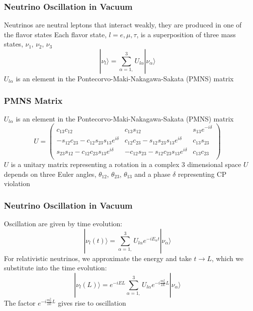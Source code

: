 \documentclass[10pt,professionalfonts,xcolor=table]{beamer}
\begin{document}
\frame
{
  \frametitle{Neutrino Oscillation in Vacuum}
  \begin{itemize}
  \bang Neutrinos are neutral leptons that interact weakly, they are produced in one of the flavor states
  \gap
  \bang Each flavor state, $l=e,\mu,\tau$,  is a superposition of three mass states, $\nu_1$, $\nu_2$, $\nu_3$
  \gap
  \begin{equation*}
|\nu_l \rangle = \sum_{\alpha = 1,}^3 U_{l\alpha}|\nu_\alpha \rangle
  \end{equation*}
  \gap
  \bang $U_{l\alpha}$ is an element in the Pontecorvo-Maki-Nakagawa-Sakata (PMNS) matrix
  \end{itemize}

}


\frame
{
  \frametitle{PMNS Matrix}
  \begin{itemize}
  \bang $U_{l\alpha}$ is an element in the Pontecorvo-Maki-Nakagawa-Sakata (PMNS) matrix
  \begin{equation*}
 U = \begin{pmatrix} \label{pmns}
c_{13}c_{12}              &    c_{13}s_{12} 	   	 & 		s_{13} e^{-i\delta} \\
-s_{12}c_{23} - c_{12}s_{23}s_{13}e^{i\delta}	& c_{12}c_{23} - s_{12}s_{23}s_{13}e^{i\delta} 				& 		c_{13}s_{23}  \\
s_{23}s_{12} - c_{12}c_{23}s_{13}e^{i\delta}	& -c_{12}s_{23} - s_{12}c_{23}s_{13}e^{i\delta} 				& 		c_{13}c_{23}  \\
\end{pmatrix}
\end{equation*}
\gap
\bang $U$ is a unitary matrix representing a rotation in a complex 3 dimensional space
\gap
\bang $U$ depends on three Euler angles, $\theta_{12}$, $\theta_{23}$, $\theta_{13}$ and a phase $\delta$ representing CP violation
  \end{itemize}
}

\frame
{
  \frametitle{Neutrino Oscillation in Vacuum}
  \begin{itemize}
	\bang Oscillation are given by time evolution:
	\begin{equation*}
		|\nu_l(t) \rangle = \sum_{\alpha = 1,}^3 U_{l\alpha}e^{-iE_\alpha t}|\nu_\alpha \rangle
	\end{equation*}
	\bang For relativistic neutrinos, we approximate the energy and take $t \rightarrow L$, which we substitute into the time evolution:
	\begin{equation*}
		|\nu_l(L) \rangle = e^{-iEL} \sum_{\alpha = 1,}^3 U_{l\alpha}e^{-i\frac{m_\alpha^2}{2E} L}|\nu_\alpha \rangle
	\end{equation*}
  \gap
	\bang The factor $e^{-i\frac{m_\alpha^2}{2E} L}$ gives rise to oscillation


  \end{itemize}
}
\end{document}
